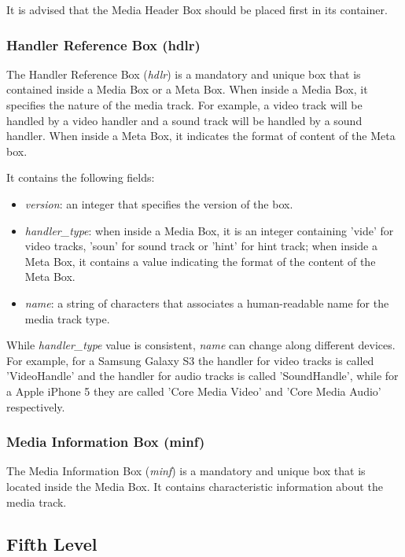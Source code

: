 It is advised that the Media Header Box should be placed first in its container.

\subsubsection*{Handler Reference Box (hdlr)}

The Handler Reference Box (\emph{hdlr}) is a mandatory and unique box that is contained inside a Media Box or a Meta Box. When inside a Media Box, it specifies the nature of the media track. For example, a video track will be handled by a video handler and a sound track will be handled by a sound handler. When inside a Meta Box, it indicates the format of content of the Meta box.

It contains the following fields:

\begin{itemize}
\item \emph{version}: an integer that specifies the version of the box.
\item \emph{handler\_type}: when inside a Media Box, it is an integer containing 'vide' for video tracks, 'soun' for sound track or 'hint' for hint track; when inside a Meta Box,  it contains a value indicating the format of the content of the Meta Box.
\item \emph{name}: a string of characters that associates a human-readable name for the media track type.
\end{itemize} 

While \emph{handler\_type} value is consistent, \emph{name} can change along different devices. For example, for a Samsung Galaxy S3 the handler for video tracks is called 'VideoHandle' and the handler for audio tracks is called 'SoundHandle', while for a Apple iPhone 5 they are called 'Core Media Video' and 'Core Media Audio' respectively.

\subsubsection*{Media Information Box (minf)}

The Media Information Box (\emph{minf}) is a mandatory and unique box that is located inside the Media Box. It contains characteristic information about the media track.

\subsection{Fifth Level}

